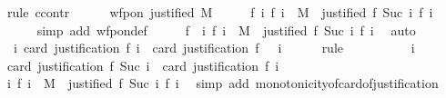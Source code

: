 \begin{isabellebody}
%
\isadelimproof
%
\endisadelimproof
%
\isatagproof
{}\isamarkupfalse%
\ {\isacharparenleft}rule\ ccontr{\isacharparenright}\ \isanewline
\ \ \isamarkupfalse%
\ {\isachardoublequoteopen}{\isasymnot}\ wfp{\isacharunderscore}on\ justified\ M{\isachardoublequoteclose}\isanewline
\ \ \isamarkupfalse%
\ \isamarkupfalse%
\ {\isachardoublequoteopen}{\isasymexists}f{\isachardot}\ {\isasymforall}i{\isachardot}\ f\ i\ {\isasymin}\ M\ {\isasymand}\ justified\ {\isacharparenleft}f\ {\isacharparenleft}Suc\ i{\isacharparenright}{\isacharparenright}\ {\isacharparenleft}f\ i{\isacharparenright}{\isachardoublequoteclose}\isanewline
\ \ \ \ \isamarkupfalse%
\ {\isacharparenleft}simp\ add{\isacharcolon}\ wfp{\isacharunderscore}on{\isacharunderscore}def{\isacharparenright}\isanewline
\ \ \isamarkupfalse%
\ \isamarkupfalse%
\ f\ \ {\isachardoublequoteopen}{\isasymforall}i{\isachardot}\ f\ i\ {\isasymin}\ M\ {\isasymand}\ justified\ {\isacharparenleft}f\ {\isacharparenleft}Suc\ i{\isacharparenright}{\isacharparenright}\ {\isacharparenleft}f\ i{\isacharparenright}{\isachardoublequoteclose}\ \isamarkupfalse%
\ auto\isanewline
\ \ \isamarkupfalse%
\ {\isachardoublequoteopen}{\isasymforall}\ i{\isachardot}\ card\ {\isacharparenleft}justification\ {\isacharparenleft}f\ i{\isacharparenright}{\isacharparenright}\ {\isasymle}\ card\ {\isacharparenleft}justification\ {\isacharparenleft}f\ {}{\isacharparenright}{\isacharparenright}\ {\isacharminus}\ i{\isachardoublequoteclose}\isanewline
\ \ \ \ \isamarkupfalse%
\ {\isacharparenleft}rule{\isacharparenright}\isanewline
\ \ \isamarkupfalse%
\ {\isacharminus}\isanewline
\ \ \ \ \isamarkupfalse%
\ i\isanewline
\ \ \ \ \isamarkupfalse%
\ {\isachardoublequoteopen}card\ {\isacharparenleft}justification\ {\isacharparenleft}f\ {\isacharparenleft}Suc\ i{\isacharparenright}{\isacharparenright}{\isacharparenright}\ {\isacharless}\ card\ {\isacharparenleft}justification\ {\isacharparenleft}f\ i{\isacharparenright}{\isacharparenright}{\isachardoublequoteclose}\isanewline
\ \ \ \ \isamarkupfalse%
\ {\isacartoucheopen}{\isasymforall}i{\isachardot}\ f\ i\ {\isasymin}\ M\ {\isasymand}\ justified\ {\isacharparenleft}f\ {\isacharparenleft}Suc\ i{\isacharparenright}{\isacharparenright}\ {\isacharparenleft}f\ i{\isacharparenright}{\isacartoucheclose}\ \isamarkupfalse%
\ {\isacharparenleft}simp\ add{\isacharcolon}\ monotonicity{\isacharunderscore}of{\isacharunderscore}card{\isacharunderscore}of{\isacharunderscore}justification{\isacharparenright}\isanewline

\end{isabellebody}
